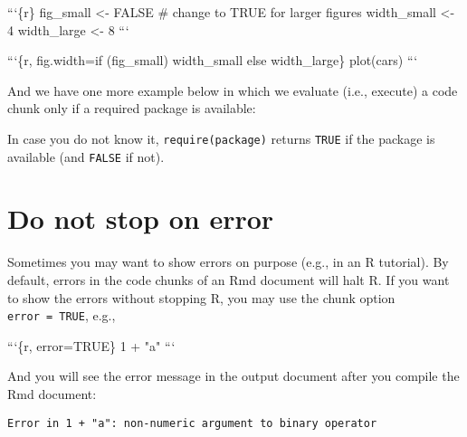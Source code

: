 \documentclass[
  11pt,
]{krantz}
\newenvironment{Shaded}{\begin{snugshade}}{\end{snugshade}}
\newcommand{\BaseNTok}[1]{\textcolor[rgb]{0.06,0.06,0.06}{#1}}
\begin{document}
\begin{Shaded}
\begin{Highlighting}[]
\BaseNTok{```\{r\}}
\BaseNTok{fig_small <- FALSE  # change to TRUE for larger figures}
\BaseNTok{width_small <- 4}
\BaseNTok{width_large <- 8}
\BaseNTok{```}

\BaseNTok{```\{r, fig.width=if (fig_small) width_small else width_large\}}
\BaseNTok{plot(cars)}
\BaseNTok{```}
\end{Highlighting}
\end{Shaded}

And we have one more example below in which we evaluate (i.e., execute) a code chunk only if a required package is available:

\begin{Shaded}
\end{Shaded}

In case you do not know it, \texttt{require(\textquotesingle{}package\textquotesingle{})} returns \texttt{TRUE} if the package is available (and \texttt{FALSE} if not).

\hypertarget{opts-error}{%
\section{Do not stop on error}\label{opts-error}}

Sometimes you may want to show errors on purpose (e.g., in an R tutorial). By default, errors in the code chunks of an Rmd document will halt R. If you want to show the errors without stopping R, you may use the chunk option \texttt{error\ =\ TRUE}, e.g.,

\begin{Shaded}
\begin{Highlighting}[]
\BaseNTok{```\{r, error=TRUE\}}
\BaseNTok{1 + "a"}
\BaseNTok{```}
\end{Highlighting}
\end{Shaded}

And you will see the error message in the output document after you compile the Rmd document:

\begin{verbatim}
Error in 1 + "a": non-numeric argument to binary operator
\end{verbatim}
\end{document}
